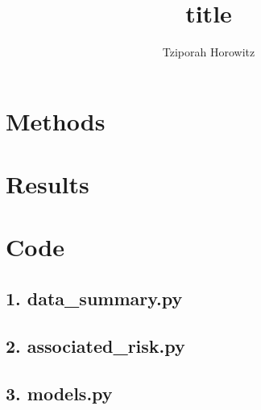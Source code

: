 \documentclass[letterpaper,man,natbib,donotrepeattitle]{apa6}
\title{title}  %
\author{Tziporah Horowitz}
\affiliation{Johns Hopkins University}
\begin{document}
\maketitle



\section{Methods}\label{sec:methods}


\section{Results}\label{sec:results}





\clearpage

\appendix
\renewcommand{\thesection}{\Alph{section}}

\section{Code}\label{sec:code}

\subsection{1. data\_summary.py}\label{subsec:data_summary.py}


\clearpage

\subsection{2. associated\_risk.py}\label{subsec:associated_risk.py}


\clearpage

\subsection{3. models.py}\label{subsec:models.py}

\end{document}

